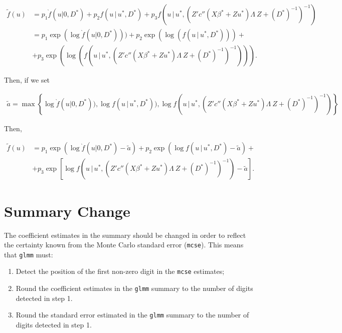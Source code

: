 \documentclass{article}
\begin{document}
\begin{align}
\tilde{f}(u) &= p_1  \grave{f}(u|0,D^*)+p_2  f(u \, | \, u^*, D^*)+p_3  f(u \, | \, u^*, (Z'  c''(X \beta^*+Zu^*) \Lambda \ Z +(D^*)^{-1}   )^{-1}) \\
&= p_1 \exp( \log  \grave{f}(u|0,D^*) ))+p_2 \exp( \log(  f(u \, | \, u^*, D^*) ))+ \nonumber \\
&+ p_3 \exp( \log( f(u \, | \, u^*, (Z'  c''(X \beta^*+Zu^*) \Lambda \ Z +(D^*)^{-1}   )^{-1}) )).
\end{align}

\noindent Then, if we set

\begin{align}
\tilde{a}= \max \left\{ \log  \grave{f}(u|0,D^*) ), \log  f(u \, | \, u^*, D^*) ), \log f(u \, | \, u^*, (Z'  c''(X \beta^*+Zu^*) \Lambda \ Z +(D^*)^{-1}   )^{-1})  \right\}
\end{align}

Then, 

\begin{align}
 \tilde{f}(u) 
&= p_1 \exp\left( \log  \grave{f}(u|0,D^*)  -\tilde{a}\right)+p_2 \exp \left( \log  f(u \, | \, u^*, D^* )-\tilde{a} \right)+ \nonumber\\
&+ p_3 \exp\left[ \log f \left(u \, | \, u^*, (Z'  c''(X \beta^*+Zu^*) \Lambda \ Z +(D^*)^{-1}   )^{-1} \right)  -\tilde{a} \right].
\end{align}

\section{Summary Change}

The coefficient estimates in the summary should be changed in order to reflect the certainty known from the Monte Carlo standard error (\texttt{mcse}). This means that \texttt{glmm} must:

\begin{enumerate}
\item Detect the position of the first non-zero digit in the \texttt{mcse} estimates;
\item Round the coefficient estimates in the \texttt{glmm} summary to the number of digits detected in step 1.
\item Round the standard error estimated in the \texttt{glmm} summary to the number of digits detected in step 1.
\end{enumerate}
\end{document}
